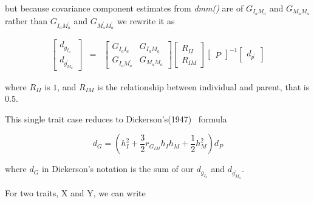 \documentclass[titlepage]{article}  %
\begin{document}
but because covariance component estimates from {\em dmm()} are of $G_{I_{a}M_{a}}$ and $G_{M_{a}M_{a}}$ rather than $G_{I_{a}M^{\prime}_{a}}$ and $G_{M^{\prime}_{a}M^{\prime}_{a}}$ we rewrite it as 

\begin{eqnarray*}
 \left[ \begin{array}{c}
 d_{g_{I_{a}}} \\
 d_{g^{\prime}_{M_{a}}}
\end{array} \right]
 & = &
 \left[ \begin{array}{cc}
 G_{I_{a}I_{a}} & G_{I_{a}M_{a}} \\ 
 G_{I_{a}M^{\prime}_{a}} & G_{M_{a}M_{a}}
\end{array} \right]
\left[ \begin{array}{cc}
 R_{II} \\ 
 R_{IM} 
\end{array} \right] 
\left[ \begin{array}{c}
 P
\end{array} \right] ^{-1}
 \left[ \begin{array}{c}
 d_{p^{\prime}}
\end{array} \right]
\end{eqnarray*}

where $R_{II}$ is $1$, and $R_{IM}$ is the relationship between individual and parent, that is $0.5$.

This single trait case reduces to Dickerson's(1947)~\cite{dick:47} formula 

\begin{displaymath}
d_{G} = (h^{2}_{I} + \frac{3}{2} r_{G_{IM}}h_{I}h_{M} + \frac{1}{2}h^{2}_{M}) d_{P} 
\end{displaymath}

where $d_{G}$ in Dickerson's notation is the sum of our $d_{g_{I_{a}}}$ and $d_{g^{\prime}_{M_{a}}}$.

For two traits, X and Y, we can write
 
\end{document}
